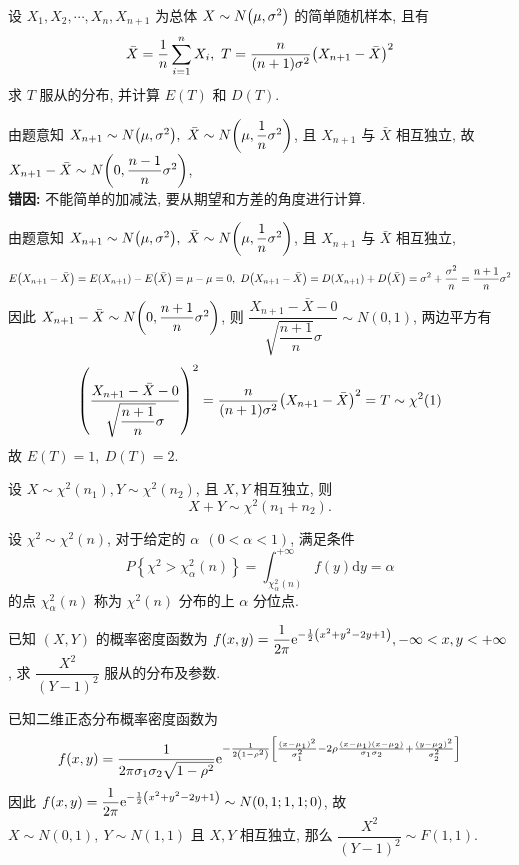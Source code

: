 \begin{example}
    设 $X_1,X_2,\cdots,X_n,X_{n+1}$ 为总体 $X\sim N\qty(\mu,\sigma^2)$ 的简单随机样本, 且有 $$\bar{X}=\dfrac{1}{n}\displaystyle\sum_{i=1}^{n}X_i,~T=\dfrac{n}{(n+1)\sigma^2}\qty(X_{n+1}-\bar{X})^2$$
    求 $T$ 服从的分布, 并计算 $E(T)$ 和 $D(T)$.
\end{example}
\begin{errorSolution}
    由题意知 $X_{n+1}\sim N\qty(\mu,\sigma^2),~\bar{X}\sim N\qty(\mu,\dfrac{1}{n}\sigma^2)$, 且 $X_{n+1}$ 与 $\bar{X}$ 相互独立, 故 $X_{n+1}-\bar{X}\sim N\qty(0,\dfrac{n-1}{n}\sigma^2)$, \\
    \textbf{错因: }不能简单的加减法, 要从期望和方差的角度进行计算.\\
\end{errorSolution}
\begin{solution}
    由题意知 $X_{n+1}\sim N\qty(\mu,\sigma^2),~\bar{X}\sim N\qty(\mu,\dfrac{1}{n}\sigma^2)$, 且 $X_{n+1}$ 与 $\bar{X}$ 相互独立, 
    $$E\qty(X_{n+1}-\bar{X})=E(X_{n+1})-E\qty(\bar{X})=\mu-\mu=0,~D\qty(X_{n+1}-\bar{X})=D(X_{n+1})+D\qty(\bar{X})=\sigma^2+\dfrac{\sigma^2}{n}=\dfrac{n+1}{n}\sigma^2$$
    因此 $X_{n+1}-\bar{X}\sim N\qty(0,\dfrac{n+1}{n}\sigma^2)$, 则 $\dfrac{X_{n+1}-\bar{X}-0}{\sqrt{\dfrac{n+1}{n}}\sigma}\sim N(0,1)$, 两边平方有
    $$\qty(\dfrac{X_{n+1}-\bar{X}-0}{\sqrt{\dfrac{n+1}{n}}\sigma})^2=\dfrac{n}{(n+1)\sigma^2}\qty(X_{n+1}-\bar{X})^2=T\sim\chi^2(1)$$
    故 $E(T)=1,~D(T)=2.$
\end{solution}

\begin{theorem}[分布的可加性]
    设 $ X \sim \chi^{2}\left(n_{1}\right), Y \sim \chi^{2}\left(n_{2}\right) $, 且 $ X, Y $ 相互独立, 则
    $$X+Y \sim \chi^{2}\left(n_{1}+n_{2}\right) .$$
\end{theorem}

\begin{theorem}
    设 $ \chi^{2} \sim \chi^{2}(n) $, 对于给定的 $ \alpha~~(0<\alpha<1) $, 满足条件
    $$P\left\{\chi^{2}>\chi_{\alpha}^{2}(n)\right\}=\int_{\chi_{\alpha}^{2}(n)}^{+\infty} f(y) \mathrm{d} y=\alpha$$
    的点 $ \chi_{\alpha}^{2}(n) $ 称为 $ \chi^{2}(n) $ 分布的上 $ \alpha $ 分位点.
\end{theorem}

\begin{example}
    已知 $(X,Y)$ 的概率密度函数为 $\displaystyle f(x,y)=\dfrac{1}{2\pi}\mathrm{e}^{-\frac{1}{2}\qty(x^2+y^2-2y+1)},-\infty<x,y<+\infty$, 求 $\dfrac{X^2}{(Y-1)^2}$ 服从的分布及参数.
\end{example}
\begin{solution}
    已知二维正态分布概率密度函数为 $$f(x,y)=\dfrac{1}{2\pi\sigma_1\sigma_2\sqrt{1-\rho^2}}\mathrm{e}^{-\frac{1}{2\qty(1-\rho^2)}\qty[\frac{(x-\mu_1)^2}{\sigma_1^2}-2\rho\frac{(x-\mu_1)(x-\mu_2)}{\sigma_1\sigma_2}+\frac{(y-\mu_2)^2}{\sigma_2^2}]}$$
    因此 $f(x,y)=\dfrac{1}{2\pi}\mathrm{e}^{-\frac{1}{2}\qty(x^2+y^2-2y+1)}\sim N(0,1;1,1;0)$, 故 $X\sim N(0,1),~Y\sim N(1,1)$ 且 $X,Y$ 相互独立, 那么 $\dfrac{X^2}{(Y-1)^2}\sim F(1,1).$
\end{solution}

